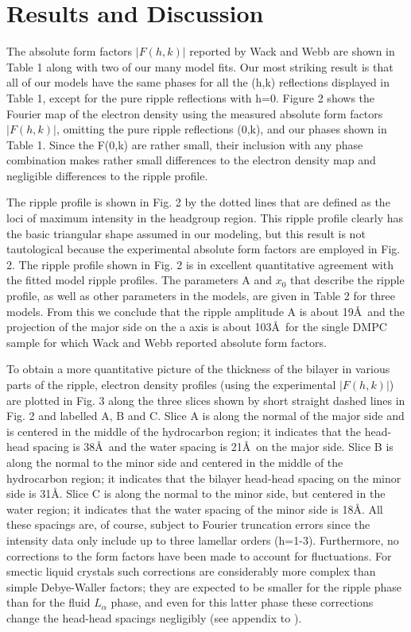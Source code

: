 \section{Results and Discussion}

The absolute form factors $|F(h,k)|$ reported by Wack and Webb \cite{Wac89a} 
are shown in Table 1 along with two of our many model fits.
Our most striking result is that all of our models have the same
phases for all the (h,k) reflections displayed in Table 1,
except for the pure ripple
reflections with h=0.  Figure 2 shows the Fourier map
of the electron density using the measured \cite{Wac89a} absolute form factors
$|F(h,k)|$, omitting the pure ripple reflections (0,k),
and our phases shown in Table 1.
Since the F(0,k) are rather small, their inclusion with any phase
combination makes rather small differences to the electron
density map and negligible differences to the ripple profile.

The ripple profile is shown in Fig. 2 by the dotted lines
that are defined as the loci of maximum intensity in the headgroup
region.  This ripple profile clearly has the basic triangular shape
assumed in our modeling, but this result is not tautological because 
the experimental 
absolute form factors are employed in Fig. 2.
The ripple profile shown in Fig. 2 is in excellent quantitative
agreement with the fitted model ripple profiles.  The parameters
A and $x_0$ that describe the ripple profile, as well as other
parameters in the models, are given in Table 2 for three models.
From this we conclude that the ripple amplitude A is about 19\AA\
and the projection of the major side on the a axis is about 103\AA\
for the single DMPC sample for which Wack and Webb \cite{Wac89a}
reported absolute form factors.

To obtain a more quantitative picture of the thickness of the
bilayer in various parts of the ripple, electron density profiles
(using the experimental $|F(h,k)|$)
are plotted in Fig. 3 along the three slices shown by short straight dashed
lines in Fig. 2 and labelled A, B and C.
Slice A is along the normal of the major side and is centered in the
middle of the hydrocarbon region; it indicates that the head-head 
spacing is 38\AA\ and the water spacing is 21\AA\ on the major side.
Slice B is along the normal to the minor side and centered
in the middle of the hydrocarbon region; it indicates that
the bilayer head-head spacing on the minor side is 31\AA.
Slice C is along the normal to the minor side, but centered in
the water region; it indicates that the water spacing of the
minor side is 18\AA.
All these spacings are, of course, subject to Fourier truncation
errors since the intensity data only include up to three lamellar orders 
(h=1-3).  Furthermore, no corrections to the form factors have been
made to account for fluctuations.  For smectic liquid crystals such
corrections are considerably more complex than simple Debye-Waller
factors; they are expected to be smaller for the ripple phase than
for the fluid $L_{\alpha}$ phase, and even for this latter phase
these corrections change the head-head spacings negligibly
(see appendix to \cite{Nagle96}).

